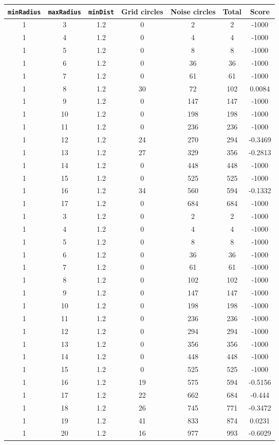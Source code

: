 \documentclass[letterpaper, 12pt]{article}
\begin{document}
\begin{longtable}{|c|c|c|c|c|c|c|}
\hline
\textbf{\texttt{minRadius}} & \textbf{\texttt{maxRadius}} & \textbf{\texttt{minDist}} & \textbf{Grid circles} & \textbf{Noise circles} & \textbf{Total} & \textbf{Score} \\
\hline
1 & 3 & 1.2 & 0 & 2 & 2 & -1000 \\
\hline
1 & 4 & 1.2 & 0 & 4 & 4 & -1000 \\
\hline
1 & 5 & 1.2 & 0 & 8 & 8 & -1000 \\
\hline
1 & 6 & 1.2 & 0 & 36 & 36 & -1000 \\
\hline
1 & 7 & 1.2 & 0 & 61 & 61 & -1000 \\
\hline
1 & 8 & 1.2 & 30 & 72 & 102 & 0.0084 \\
\hline
1 & 9 & 1.2 & 0 & 147 & 147 & -1000 \\
\hline
1 & 10 & 1.2 & 0 & 198 & 198 & -1000 \\
\hline
1 & 11 & 1.2 & 0 & 236 & 236 & -1000 \\
\hline
1 & 12 & 1.2 & 24 & 270 & 294 & -0.3469 \\
\hline
1 & 13 & 1.2 & 27 & 329 & 356 & -0.2813 \\
\hline
1 & 14 & 1.2 & 0 & 448 & 448 & -1000 \\
\hline
1 & 15 & 1.2 & 0 & 525 & 525 & -1000 \\
\hline
1 & 16 & 1.2 & 34 & 560 & 594 & -0.1332 \\
\hline
1 & 17 & 1.2 & 0 & 684 & 684 & -1000 \\
\hline
1 & 3 & 1.2 & 0 & 2 & 2 & -1000 \\
\hline
1 & 4 & 1.2 & 0 & 4 & 4 & -1000 \\
\hline
1 & 5 & 1.2 & 0 & 8 & 8 & -1000 \\
\hline
1 & 6 & 1.2 & 0 & 36 & 36 & -1000 \\
\hline
1 & 7 & 1.2 & 0 & 61 & 61 & -1000 \\
\hline
1 & 8 & 1.2 & 0 & 102 & 102 & -1000 \\
\hline
1 & 9 & 1.2 & 0 & 147 & 147 & -1000 \\
\hline
1 & 10 & 1.2 & 0 & 198 & 198 & -1000 \\
\hline
1 & 11 & 1.2 & 0 & 236 & 236 & -1000 \\
\hline
1 & 12 & 1.2 & 0 & 294 & 294 & -1000 \\
\hline
1 & 13 & 1.2 & 0 & 356 & 356 & -1000 \\
\hline
1 & 14 & 1.2 & 0 & 448 & 448 & -1000 \\
\hline
1 & 15 & 1.2 & 0 & 525 & 525 & -1000 \\
\hline
1 & 16 & 1.2 & 19 & 575 & 594 & -0.5156 \\
\hline
1 & 17 & 1.2 & 22 & 662 & 684 & -0.444 \\
\hline
1 & 18 & 1.2 & 26 & 745 & 771 & -0.3472 \\
\hline
1 & 19 & 1.2 & 41 & 833 & 874 & 0.0231 \\
\hline
1 & 20 & 1.2 & 16 & 977 & 993 & -0.6029 \\
\hline
\end{longtable}
\end{document}
